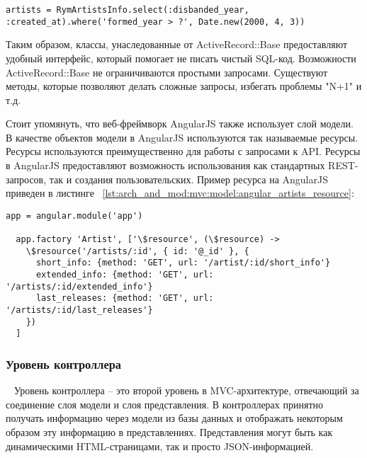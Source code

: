 \begin{lstlisting}[style=fsharpstyle,caption={Пример получения артистов по определённым параметрам}, label=lst:arch_and_mod:mvc:model:select_artist_where_year]
  artists = RymArtistsInfo.select(:disbanded_year, :created_at).where('formed_year > ?', Date.new(2000, 4, 3))
\end{lstlisting}

Таким образом, классы, унаследованные от ActiveRecord::Base предоставляют удобный интерфейс, который помогает не писать чистый SQL-код. Возможности ActiveRecord::Base не ограничиваются простыми запросами. Существуют методы, которые позволяют делать сложные запросы, избегать проблемы "N+1" и т.д.

Стоит упомянуть, что веб-фреймворк AngularJS также использует слой модели. В качестве объектов модели в AngularJS используются так называемые ресурсы. Ресурсы используются преимущественно для работы с запросами к API. Ресурсы в AngularJS предоставляют возможность использования как стандартных REST-запросов, так и создания пользовательских. Пример ресурса на AngularJS приведен в листинге ~\ref{lst:arch_and_mod:mvc:model:angular_artists_resource}:

\begin{lstlisting}[style=fsharpstyle,caption={Пример получения артистов по определённым параметрам}, label=lst:arch_and_mod:mvc:model:angular_artists_resource]
  app = angular.module('app')

  app.factory 'Artist', ['\$resource', (\$resource) ->
    \$resource('/artists/:id', { id: '@_id' }, {
      short_info: {method: 'GET', url: '/artist/:id/short_info'}
      extended_info: {method: 'GET', url: '/artists/:id/extended_info'}
      last_releases: {method: 'GET', url: '/artists/:id/last_releases'}
    })
  ]
\end{lstlisting}

\subsubsection{Уровень контроллера}
\label{sub:arch_and_mod:mvc:controller}
~\newline
\indent Уровень контроллера -- это второй уровень в MVC-архитектуре, отвечающий за соединение слоя модели и слоя представления. В контроллерах принятно получать информацию через модели из базы данных и отображать некоторым образом эту информацию в представлениях. Представления могут быть как динамическими HTML-страницами, так и просто JSON-информацией.

